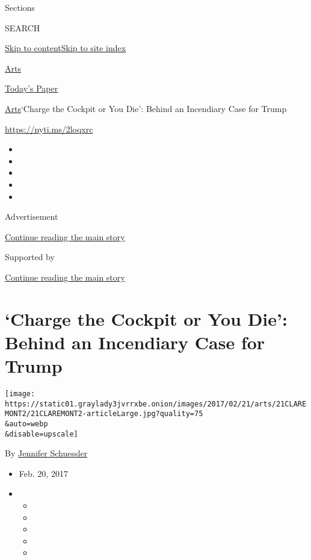 Sections

SEARCH

\protect\hyperlink{site-content}{Skip to
content}\protect\hyperlink{site-index}{Skip to site index}

\href{https://www.nytimes3xbfgragh.onion/section/arts}{Arts}

\href{https://myaccount.nytimes3xbfgragh.onion/auth/login?response_type=cookie\&client_id=vi}{}

\href{https://www.nytimes3xbfgragh.onion/section/todayspaper}{Today's
Paper}

\href{/section/arts}{Arts}\textbar{}`Charge the Cockpit or You Die':
Behind an Incendiary Case for Trump

\url{https://nyti.ms/2loqxrc}

\begin{itemize}
\item
\item
\item
\item
\item
\end{itemize}

Advertisement

\protect\hyperlink{after-top}{Continue reading the main story}

Supported by

\protect\hyperlink{after-sponsor}{Continue reading the main story}

\hypertarget{charge-the-cockpit-or-you-die-behind-an-incendiary-case-for-trump}{%
\section{`Charge the Cockpit or You Die': Behind an Incendiary Case for
Trump}\label{charge-the-cockpit-or-you-die-behind-an-incendiary-case-for-trump}}

\texttt{[image: https://static01.graylady3jvrrxbe.onion/images/2017/02/21/arts/21CLAREMONT2/21CLAREMONT2-articleLarge.jpg?quality=75\\\&auto=webp\\\&disable=upscale]}

By
\href{https://www.nytimes3xbfgragh.onion/by/jennifer-schuessler}{Jennifer
Schuessler}

\begin{itemize}
\item
  Feb. 20, 2017
\item
  \begin{itemize}
  \item
  \item
  \item
  \item
  \item
  \end{itemize}
\end{itemize}

